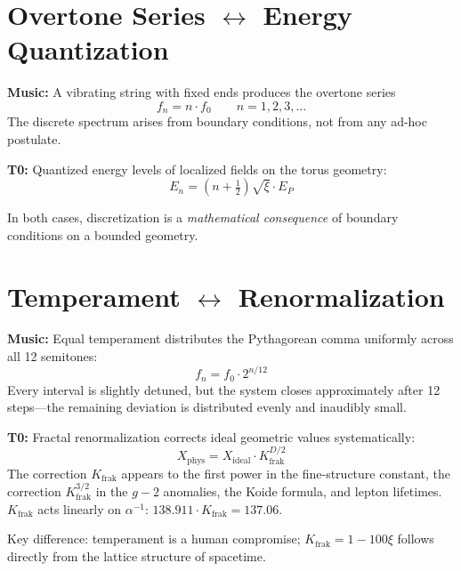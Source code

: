\section{\texorpdfstring{Overtone Series $\leftrightarrow$ Energy Quantization}{Overtone Series -- Energy Quantization}}

\textbf{Music:} A vibrating string with fixed ends produces the overtone series
\begin{equation}
	f_n = n \cdot f_0 \qquad n = 1, 2, 3, \ldots
\end{equation}
The discrete spectrum arises from boundary conditions, not from any ad-hoc postulate.

\textbf{T0:} Quantized energy levels of localized fields on the torus geometry:
\begin{equation}
	E_n = \left(n + \tfrac{1}{2}\right) \sqrt{\xi} \cdot E_P
\end{equation}

In both cases, discretization is a \emph{mathematical consequence} of boundary conditions on a bounded geometry.

\section{\texorpdfstring{Temperament $\leftrightarrow$ Renormalization}{Temperament -- Renormalization}}

\textbf{Music:} Equal temperament distributes the Pythagorean comma uniformly across all 12 semitones:
\begin{equation}
	f_n = f_0 \cdot 2^{n/12}
\end{equation}
Every interval is slightly detuned, but the system closes approximately after 12 steps---the remaining deviation is distributed evenly and inaudibly small.

\textbf{T0:} Fractal renormalization corrects ideal geometric values systematically:
\begin{equation}
	X_\text{phys} = X_\text{ideal} \cdot K_\text{frak}^{D/2}
\end{equation}
The correction $K_\text{frak}$ appears to the first power in the fine-structure constant, the correction $K_\text{frak}^{3/2}$ in the $g-2$ anomalies, the Koide formula, and lepton lifetimes. $K_\text{frak}$ acts linearly on $\alpha^{-1}$: $138.911 \cdot K_\text{frak} = 137.06$.

Key difference: temperament is a human compromise; $K_\text{frak} = 1 - 100\xi$ follows directly from the lattice structure of spacetime.


